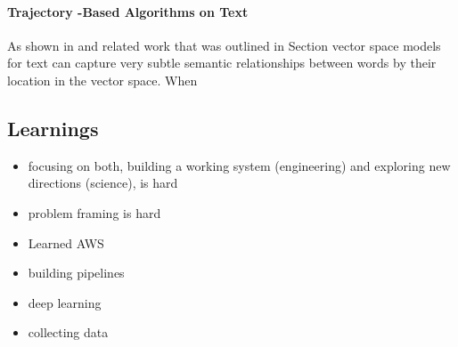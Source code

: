 \paragraph{Trajectory -Based Algorithms on Text}
\label{par:Trajectory Algorithms on Text}
As shown in \cite{Mikolov:2013ac} and related work that was outlined in Section vector space models for text can capture very subtle semantic relationships between words by their location in the vector space. When


\subsection{Learnings}
\label{sub:learnings}

\begin{itemize}
  \item focusing on both, building a working system (engineering) and exploring new directions (science), is hard
  \item problem framing is hard
  \item Learned AWS
  \item building pipelines
  \item deep learning
  \item collecting data
\end{itemize}
